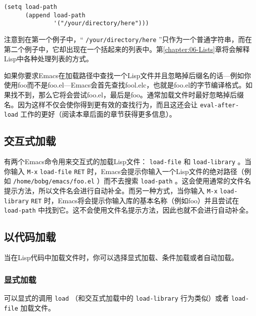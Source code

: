 \begin{verbatim}
(setq load-path
      (append load-path
              '("/your/directory/here")))
\end{verbatim}

注意到在第一个例子中，“ \verb|/your/directory/here| ”只作为一个普通字符串，而在第二个例子中，它却出现在一个括起来的列表中。第\ref{chapter:06-Lists}章将会解释Lisp中各种处理列表的方式。

如果你要求Emacs在加载路径中查找一个Lisp文件并且忽略掉后缀名的话---例如你使用foo而不是foo.el---Emacs会首先查找fool.elc，也就是foo.el的字节编译格式。如果找不到，那么它将会尝试foo.el，最后是foo。通常加载文件时最好忽略掉后缀名。因为这样不仅会使你得到更有效的查找行为，而且这还会让 \texttt{eval-after-load} 工作的更好（阅读本章后面的章节获得更多信息）。

\subsection{交互式加载}
\label{section:05-Interactive-Loading}

有两个Emacs命令用来交互式的加载Lisp文件： \texttt{load-file} 和 \texttt{load-library} 。当你输入 \verb|M-x| \texttt{load-file} \verb|RET| 时，Emacs会提示你输入一个Lisp文件的绝对路径（例如 \verb|/home/bobg/emacs/foo.el| ）而不去搜索 \texttt{load-path} 。这会使用通常的文件名提示方法，所以文件名会进行自动补全。而另一种方式，当你输入 \verb|M-x| \texttt{load-library} \verb|RET| 时，Emacs将会提示你输入库的基本名称（例如foo）并且尝试在 \texttt{load-path} 中找到它。这不会使用文件名提示方法，因此也就不会进行自动补全。

\subsection{以代码加载}
\label{section:05-Programmatic-Loading}

当在Lisp代码中加载文件时，你可以选择显式加载、条件加载或者自动加载。

\subsubsection{显式加载}
\label{section:05-Explicit-Loading}

可以显式的调用 \texttt{load} （和交互式加载中的 \texttt{load-library} 行为类似）或者 \texttt{load-file} 加载文件。

